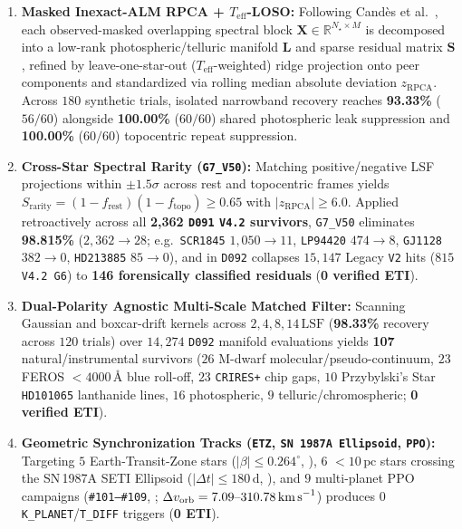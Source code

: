 \documentclass[twocolumn,10pt]{article}
\begin{document}
\begin{enumerate}
  \item \textbf{Masked Inexact-ALM RPCA + $T_{\mathrm{eff}}$-LOSO:} Following Cand\`{e}s et al.\ \cite{Candes2011}, each observed-masked overlapping spectral block $\mathbf{X} \in \mathbb{R}^{N_{\star}\times M}$ is decomposed into a low-rank photospheric/telluric manifold $\mathbf{L}$ and sparse residual matrix $\mathbf{S}$, refined by leave-one-star-out ($T_{\mathrm{eff}}$-weighted) ridge projection onto peer components and standardized via rolling median absolute deviation $z_{\mathrm{RPCA}}$. Across $180$ synthetic trials, isolated narrowband recovery reaches \textbf{93.33\%} ($56/60$) alongside \textbf{100.00\%} ($60/60$) shared photospheric leak suppression and \textbf{100.00\%} ($60/60$) topocentric repeat suppression.
  \item \textbf{Cross-Star Spectral Rarity (\texttt{G7\_V50}):} Matching positive/negative LSF projections within $\pm 1.5\sigma$ across rest and topocentric frames yields $S_{\mathrm{rarity}} = (1 - f_{\mathrm{rest}})(1 - f_{\mathrm{topo}}) \ge 0.65$ with $|z_{\mathrm{RPCA}}| \ge 6.0$. Applied retroactively across all \textbf{2,362 \texttt{D091} \texttt{V4.2} survivors}, \texttt{G7\_V50} eliminates \textbf{98.815\%} ($2{,}362 \rightarrow 28$; e.g.\ \texttt{SCR1845} $1{,}050\rightarrow 11$, \texttt{LP94420} $474\rightarrow 8$, \texttt{GJ1128} $382\rightarrow 0$, \texttt{HD213885} $85\rightarrow 0$), and in \texttt{D092} collapses $15{,}147$ Legacy \texttt{V2} hits ($815$ \texttt{V4.2 G6}) to \textbf{146 forensically classified residuals} (\textbf{0 verified ETI}).
  \item \textbf{Dual-Polarity Agnostic Multi-Scale Matched Filter:} Scanning Gaussian and boxcar-drift kernels across $2, 4, 8, 14\,\mathrm{LSF}$ (\textbf{98.33\%} recovery across $120$ trials) over $14{,}274$ \texttt{D092} manifold evaluations yields \textbf{107} natural/instrumental survivors ($26$ M-dwarf molecular/pseudo-continuum, $23$ FEROS $<4000\,\text{\AA}$ blue roll-off, $23$ \texttt{CRIRES+} chip gaps, $10$ Przybylski's Star \texttt{HD101065} lanthanide lines, $16$ photospheric, $9$ telluric/chromospheric; \textbf{0 verified ETI}).
  \item \textbf{Geometric Synchronization Tracks (\texttt{ETZ}, \texttt{SN 1987A Ellipsoid}, \texttt{PPO}):} Targeting $5$ Earth-Transit-Zone stars ($|\beta|\le 0.264^\circ$, \cite{Kaltenegger2021}), $6$ $<10\,\text{pc}$ stars crossing the SN\,1987A SETI Ellipsoid ($|\Delta t|\le 180\,\text{d}$, \cite{Davenport2022}), and $9$ multi-planet PPO campaigns (\texttt{\#101--\#109}, \cite{Tusay2024}; $\Delta v_{\mathrm{orb}}=7.09\text{--}310.78\,\text{km\,s}^{-1}$) produces $0$ \texttt{K\_PLANET}/\texttt{T\_DIFF} triggers (\textbf{0 ETI}).

\end{enumerate}
\end{document}
